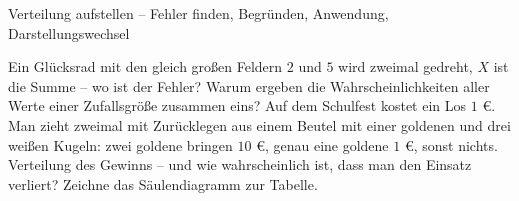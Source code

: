 \begin{aufgabe}{Verteilung aufstellen – Fehler finden, Begründen, Anwendung, Darstellungswechsel}
\begin{teile}
\teil Ein Glücksrad mit den gleich großen Feldern $2$ und $5$ wird zweimal gedreht, $X$ ist die Summe – wo ist der Fehler? 
\teil Warum ergeben die Wahrscheinlichkeiten aller Werte einer Zufallsgröße zusammen eins?
\teil Auf dem Schulfest kostet ein Los $1$ €. Man zieht zweimal mit Zurücklegen aus einem Beutel mit einer goldenen und drei weißen Kugeln: zwei goldene bringen $10$ €, genau eine goldene $1$ €, sonst nichts. Verteilung des Gewinns – und wie wahrscheinlich ist, dass man den Einsatz verliert?
\teil Zeichne das Säulendiagramm zur Tabelle. 

\end{teile}
\end{aufgabe}
